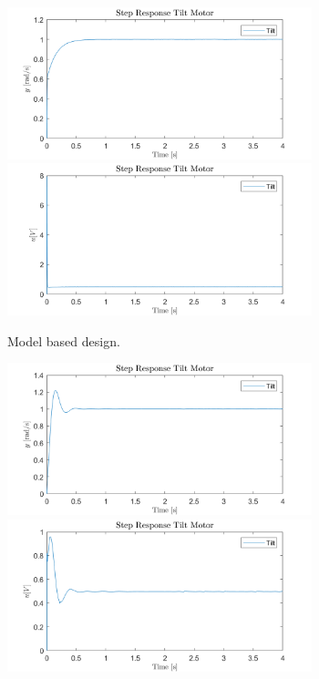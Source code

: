 \documentclass[../../main.tex]{subfiles}
\begin{document}
\begin{figure}[]
\begin{subfigure}{0.48\textwidth}
    \includegraphics[width = 0.97\textwidth]{Sections/System_Design/Images/vel_polePlace_step_y_Sat.png}
     \includegraphics[width = 0.97\textwidth]{Sections/System_Design/Images/vel_polePlace_step_u_Sat.png}
    \caption{Model based design.}
    \label{fig:step_vel_model}
\end{subfigure}\quad
\begin{subfigure}{0.48\textwidth}
    \includegraphics[width = 0.97\textwidth]{Sections/System_Design/Images/vel_ZN_step_y_Sat.png}
    \includegraphics[width = 0.97\textwidth]{Sections/System_Design/Images/vel_ZN_step_u_Sat.png}

\end{subfigure}
\end{figure}
\end{document}
